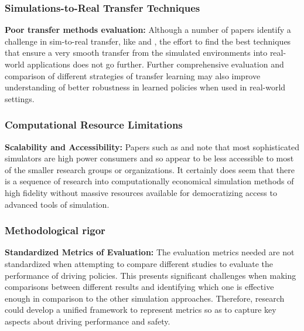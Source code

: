 \documentclass[lettersize,journal]{IEEEtran}
\begin{document}
\subsubsection{Simulations-to-Real Transfer Techniques}
\textbf{Poor transfer methods evaluation:} Although a number of papers identify a challenge in sim-to-real transfer, like \cite{ref5} and \cite{ref8}, the effort to find the best techniques that ensure a very smooth transfer from the simulated environments into real-world applications does not go further. Further comprehensive evaluation and comparison of different strategies of transfer learning may also improve understanding of better robustness in learned policies when used in real-world settings.

\subsubsection{Computational Resource Limitations}
\textbf{Scalability and Accessibility:} Papers such as \cite{ref4} and \cite{ref6} note that most sophisticated simulators are high power consumers and so appear to be less accessible to most of the smaller research groups or organizations. It certainly does seem that there is a sequence of research into computationally economical simulation methods of high fidelity without massive resources available for democratizing access to advanced tools of simulation.

\subsubsection{Methodological rigor}
\textbf{Standardized Metrics of Evaluation:} The evaluation metrics needed are not standardized when attempting to compare different studies to evaluate the performance of driving policies. This presents significant challenges when making comparisons between different results and identifying which one is effective enough in comparison to the other simulation approaches. Therefore, research could develop a unified framework to represent metrics so as to capture key aspects about driving performance and safety.
\end{document}
